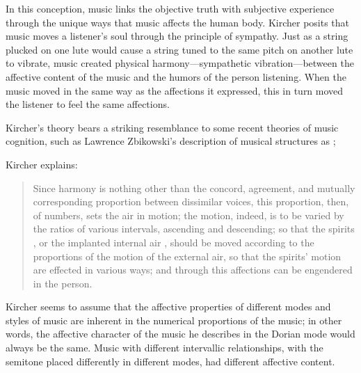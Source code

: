 In this conception, music links the objective truth with subjective experience
through the unique ways that music affects the human body.  Kircher posits that
music moves a listener's soul through the principle of sympathy.%
    \Autocites
    [On the links between this interest in the occult powers of music and early
    scientific research, see][]{Gouk:Sciences}
    {Gouk:Harmonics}
Just as a string plucked on one lute would cause a string tuned to the same
pitch on another lute to vibrate, music created physical harmony---sympathetic
vibration---between the affective content of the music and the humors of the
person listening.
When the music moved in the same way as the affections it expressed, this in
turn moved the listener to feel the same affections.%
\begin{Footnote}
    Kircher's theory bears a striking resemblance to some recent theories of
    music cognition, such as Lawrence Zbikowski's description of musical
    structures as ;
    \autocite[XXX]{Zbikowski:DanceTopoi}
\end{Footnote}
Kircher explains:
\begin{quote}
Since harmony is nothing other than the concord, agreement, and mutually
    corresponding proportion between dissimilar voices, this proportion, then,
    of numbers, sets the air in motion; the motion, indeed, is to be varied by
    the ratios of various intervals, ascending and descending; so that the
    spirits  , or the implanted internal air
     \Dots{}, should be moved according to the proportions
    of the motion of the external air, so that the spirits' motion are effected
    in various ways; and through this affections can be engendered in the
    person.%
        \Autocite
        [552: .]
        {Kircher:Musurgia}
\end{quote}
Kircher seems to assume that the affective properties of different modes and
styles of music are inherent in the numerical proportions of the music; in other
words, the affective character of the music he describes in the Dorian mode
would always be the same.
Music with different intervallic relationships, with the semitone placed
differently in different modes, had different affective content.

